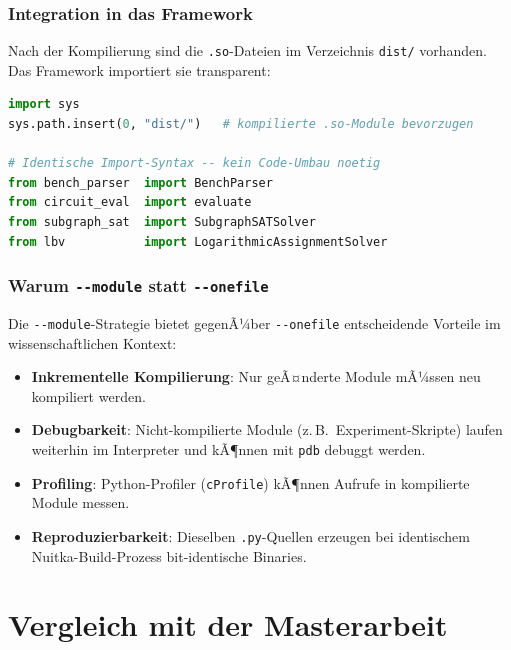 ﻿\documentclass[a4paper,12pt]{article}
\theoremstyle{definition}
\begin{document}
\subsubsection{Integration in das Framework}

Nach der Kompilierung sind die \texttt{.so}-Dateien im Verzeichnis
\texttt{dist/} vorhanden.  Das Framework importiert sie transparent:
\begin{lstlisting}[language=Python, caption={Transparenter Import kompilierter Module}]
import sys
sys.path.insert(0, "dist/")   # kompilierte .so-Module bevorzugen

# Identische Import-Syntax -- kein Code-Umbau noetig
from bench_parser  import BenchParser
from circuit_eval  import evaluate
from subgraph_sat  import SubgraphSATSolver
from lbv           import LogarithmicAssignmentSolver
\end{lstlisting}

\subsubsection{Warum \texttt{-{}-module} statt \texttt{-{}-onefile}}

Die \texttt{-{}-module}-Strategie bietet gegenÃ¼ber \texttt{-{}-onefile}
entscheidende Vorteile im wissenschaftlichen Kontext:
\begin{itemize}
  \item[-] \textbf{Inkrementelle Kompilierung}: Nur geÃ¤nderte Module
    mÃ¼ssen neu kompiliert werden.
  \item[-] \textbf{Debugbarkeit}: Nicht-kompilierte Module (z.\,B.\
    Experiment-Skripte) laufen weiterhin im Interpreter und kÃ¶nnen
    mit \texttt{pdb} debuggt werden.
  \item[-] \textbf{Profiling}: Python-Profiler (\texttt{cProfile})
    kÃ¶nnen Aufrufe in kompilierte Module messen.
  \item[-] \textbf{Reproduzierbarkeit}: Dieselben \texttt{.py}-Quellen
    erzeugen bei identischem Nuitka-Build-Prozess bit-identische Binaries.
\end{itemize}

\section{Vergleich mit der Masterarbeit}
\end{document}
